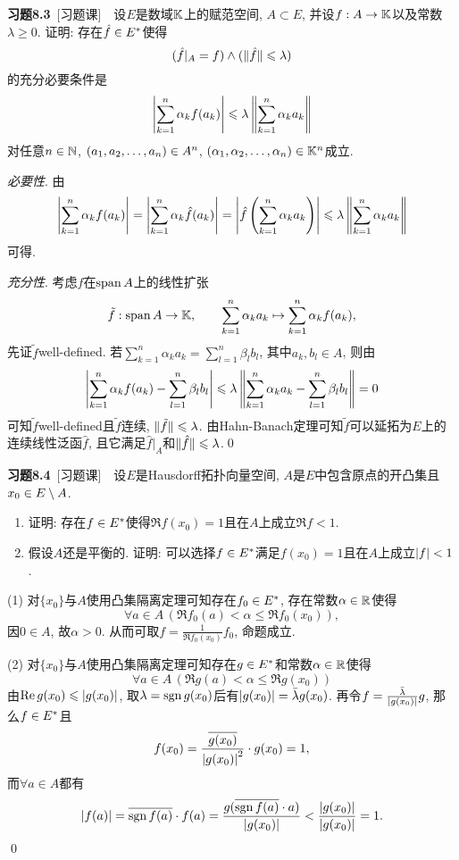	\textbf{习题8.3}\ [习题课]\ \ 设$ E $是数域$ \mathbb{K} $上的赋范空间, $ A\subset E $, 并设$ f : A\to\mathbb{K} $以及常数$ \lambda\geqslant 0 $. 证明: 存在$ \hat{f}\in E^{*} $使得
	\[
	(\hat{f}\rvert_A=f)\land (\lVert \hat{f}\rVert\leqslant\lambda)
	\]
	的充分必要条件是
	\[
	\left| \sum_{k=1}^n\alpha_kf(a_k) \right| \leqslant\lambda\left\| \sum_{k=1}^n\alpha_ka_k \right\|
	\]
	对任意$ n\in\mathbb{N} $, $ (a_{1}, a_{2}, \dots, a_{n})\in A^n $, $ (\alpha_{1}, \alpha_{2}, \dots, \alpha_{n})\in\mathbb{K}^n $成立.
	\begin{Proof}
	\textsl{必要性}. 由
	\[
	\left| \sum_{k=1}^n\alpha_kf(a_k) \right| =\left| \sum_{k=1}^n\alpha_k\hat{f}(a_k) \right| =\left| \hat{f}\left( \sum_{k=1}^n\alpha_ka_k \right) \right| \leqslant\lambda\left\| \sum_{k=1}^n\alpha_ka_k \right\|
	\]
	可得.
	
	\textsl{充分性}. 考虑$ f $在$ \operatorname{span} A $上的线性扩张
	\[
	\tilde{f} : \operatorname{span} A\to\mathbb{K},\qquad \sum_{k=1}^n\alpha_ka_k\mapsto\sum_{k=1}^n\alpha_kf(a_k),
	\]
	先证$ \tilde{f} $well-defined. 若$ \sum\limits_{k=1}^n\alpha_ka_k=\sum\limits_{l=1}^n\beta_lb_l $, 其中$ a_k, b_l\in A $, 则由
	\[
	\left| \sum_{k=1}^n\alpha_kf(a_k)-\sum_{l=1}^n\beta_lb_l \right| \leqslant\lambda\left\| \sum_{k=1}^n\alpha_ka_k-\sum_{l=1}^n\beta_lb_l \right\|=0
	\]
	可知$ \tilde{f} $well-defined且$ \tilde{f} $连续, $ \lVert \tilde{f}\rVert\leqslant\lambda $. 由Hahn-Banach定理可知$ \tilde{f} $可以延拓为$ E $上的连续线性泛函$ \hat{f} $, 且它满足$ \hat{f}\rvert_A $和$ \lVert \hat{f}\rVert\leqslant\lambda $.\qed
	\end{Proof}
	
	\textbf{习题8.4}\ [习题课]\ \ 设$ E $是Hausdorff拓扑向量空间, $ A $是$ E $中包含原点的开凸集且$ x_0\in E\setminus A $.
	\begin{enumerate}[(1)]
	\item 证明: 存在$ f\in E^{*} $使得$ \Re f(x_0)=1 $且在$ A $上成立$ \Re f<1 $.
	\item 假设$ A $还是平衡的. 证明: 可以选择$ f\in E^{*} $满足$ f(x_0)=1 $且在$ A $上成立$ \left| f \right| <1 $.
	\end{enumerate}
	\begin{Proof}
	(1) 对$ \{x_0\} $与$ A $使用凸集隔离定理可知存在$ f_0\in E^{*} $, 存在常数$ \alpha\in\mathbb{R} $使得
	\[
	\forall a\in A\,(\Re f_0(a)<\alpha\leqslant\Re f_0(x_0)),
	\]
	因$ 0\in A $, 故$ \alpha>0 $. 从而可取$ f=\frac{1}{\Re f_0(x_0)}f_0 $, 命题成立.
	
	(2) 对$ \{ x_0 \} $与$ A $使用凸集隔离定理可知存在$ g\in E^{*} $和常数$ \alpha\in\mathbb{R} $使得
	\[
	\forall a\in A\,(\Re g(a)<\alpha\leqslant\Re g(x_0))
	\]
	由$ \mathrm{Re\,} g(x_0)\leqslant\left| g(x_0) \right|  $, 取$ \lambda=\mathrm{sgn}\, g(x_0) $后有$ \left| g(x_0) \right| =\bar{\lambda}g(x_0) $. 再令$ f=\frac{\bar{\lambda}}{\left| g(x_0) \right| }g $, 那么$ f\in E^{*} $且
	\[
	f(x_0)=\frac{\overline{g(x_0)}}{\left| g(x_0) \right| ^2}\cdot g(x_0)=1,
	\]
	而$ \forall a\in A $都有
	\[
	\left| f(a) \right| =\overline{\mathrm{sgn}\, f(a)}\cdot f(a)=\frac{g(\overline{\mathrm{sgn}\, f(a)}\cdot a)}{\left| g(x_0) \right| }<\frac{\left| g(x_0) \right| }{\left| g(x_0) \right| }=1.
	\]
	\qed
	\end{Proof}
	
